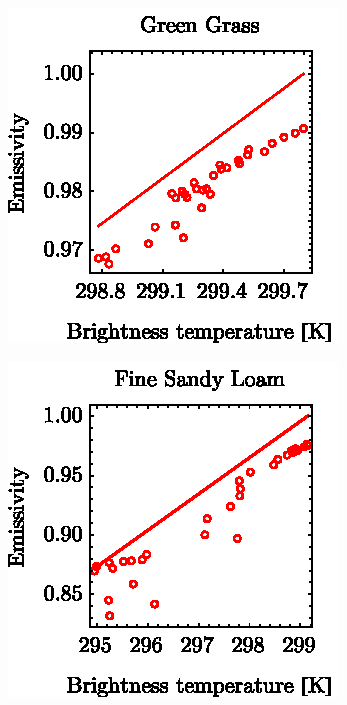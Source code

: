 \begin{figure}[thb]
	\centering
	\vspace{1em}
	\begin{subfigure}[t]{.3\linewidth}
		\centering
		\includegraphics[scale=1]{pics/Chapter_03/GreenGrass_Emiss2BrightTemp.eps}
		\vspace{-0.4cm}
		\caption{}
	\end{subfigure}
	\hspace{1em}
	\begin{subfigure}[t]{.3\linewidth}
		\centering
		\includegraphics[scale=1]{pics/Chapter_03/FineSandyLoam_Emiss2BrightTemp.eps}
		\vspace{-0.4cm}
		\caption{}
	\end{subfigure}
	\hspace{1em}
	\begin{subfigure}[t]{.3\linewidth}

\end{subfigure}
\end{figure}
